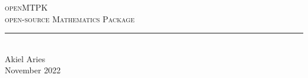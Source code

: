 \documentclass[12pt, letterpaper]{article}
\begin{document}
\newcommand{\papertitle}{Akiel Aries}
\newcommand{\papermajorheading}{openMTPK}
\newcommand{\paperminorheading}{open-source Mathematics Package}

\newcommand{\HRule}{\rule{\linewidth}{0.5mm}} %

\center %


\textsc{\Large \papermajorheading}\\[0.2cm] %
\textsc{\large \paperminorheading}\\[0.75cm] %


\HRule \\[0.4cm]
{ \papertitle}\\[0.1cm] %




{\large November 2022} \linebreak
\end{document}
